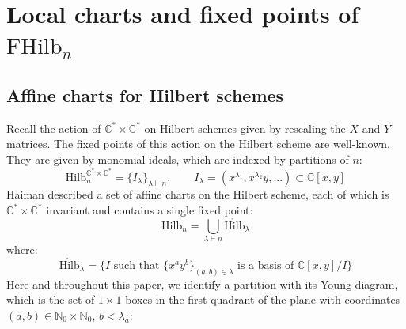 \documentclass[12pt]{amsart}
\numberwithin{equation}{section}
\theoremstyle{definition}
\theoremstyle{remark}
\newcommand{\CC}{\mathbb{C}}
\newcommand{\NN}{\mathbb{N}}
\newcommand{\cat}{\mathcal{C}}
\renewcommand{\1}{\mathbf{1}}
\newcommand{\coh}{\mathrm{Coh}}
\newcommand{\End}{\mathrm{End}}
\newcommand{\FH}{\mathrm{FHilb}}
\renewcommand{\H}{\mathrm{Hilb}}
\newcommand{\oH}{\mathring{\H}}
\newcommand{\torus}{\CC^{*} \times \CC^*}
\begin{document}

\section{Local charts and fixed points of $\FH_n$}
\label{sec:local}

\subsection{Affine charts for Hilbert schemes}
\label{sub:affinecharts1}

Recall the action of $\torus$ on Hilbert schemes given by rescaling the $X$ and $Y$ matrices. The fixed points of this action on the Hilbert scheme are well-known. They are given by monomial ideals, which are indexed by partitions of $n$:
$$
\H_n^{\torus} = \{I_\lambda\}_{\lambda \vdash n}, \qquad I_\lambda = (x^{\lambda_1}, x^{\lambda_2}y,...)\subset \CC[x,y]
$$
Haiman described a set of affine charts on the Hilbert scheme, each of which is $\torus$ invariant and contains a single fixed point:
\begin{equation}
\label{eqn:chart0}
\H_n = \bigcup_{\lambda \vdash n} \oH_\lambda
\end{equation}
where:
\begin{equation}
\label{eqn:haimanchart}
\oH_\lambda = \Big \{I \text{ such that } \{x^ay^b\}_{(a,b) \in \lambda} \text{ is a basis of } \CC[x,y]/I\Big\}
\end{equation}
Here and throughout this paper, we identify a partition with its Young diagram, which is the set of $1 \times 1$ boxes in the first quadrant of the plane with coordinates $(a,b) \in \NN_0 \times \NN_0$, $b < \lambda_{a}$:
\end{document}
